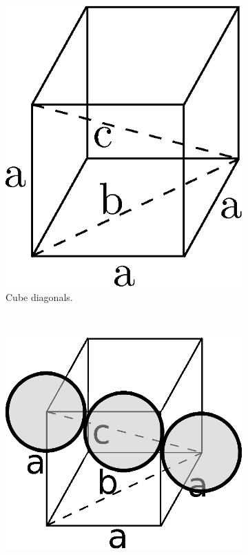 \documentclass[a4paper]{article}
\begin{document}
		\begin{figure}
			\centering
			\begin{subfigure}[b]{0.3\linewidth}
				\centering
				\includegraphics[width=\linewidth]{diag.eps}
				\caption{Cube diagonals.}
				\label{sf:diag}
			\end{subfigure}
			~
			\begin{subfigure}[b]{0.3\linewidth}
				\centering
				\includegraphics[width=\linewidth]{diag2.eps}

\end{subfigure}
\end{figure}
\end{document}
